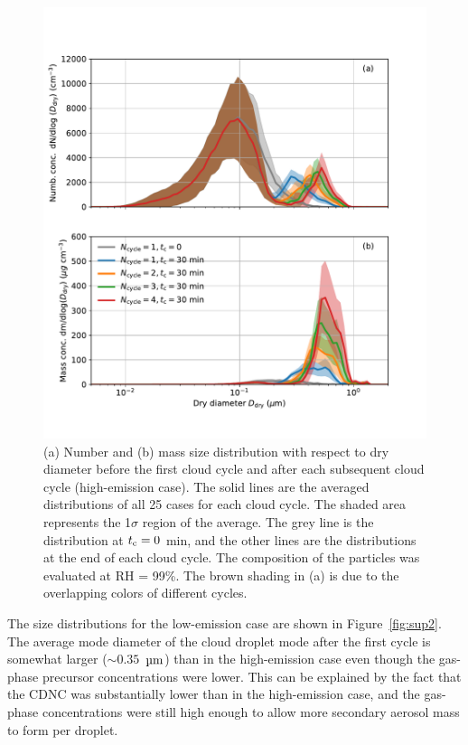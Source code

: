 \documentclass[edeposit,fullpage]{uiucthesis2009}
\begin{document}
\begin{figure}
    \centering
    \includegraphics[scale=0.45]{chap3_figs/fig5.pdf}
    \caption{(a) Number and (b) mass size distribution with respect to
      dry diameter before the first cloud cycle and after each
      subsequent cloud cycle (high-emission case). The solid
      lines are the averaged distributions of all 25 cases for each
      cloud cycle. The shaded area represents the 1$\sigma$ region of
      the average. The grey line is the distribution at $t_{\rm c}= 0$
      min, and the other lines are the distributions at the end of
      each cloud cycle. The composition of the particles was evaluated
      at RH = 99\%. The brown shading in (a) is due to the
        overlapping colors of different cycles.}
    \label{fig:size_number}
\end{figure}

The size distributions for the low-emission case are shown in
Figure~\ref{fig:sup2}. The average mode diameter of the cloud droplet
mode after the first cycle is somewhat larger ($\sim0.35$~$\rm \mu m$)
than in the high-emission case even though the gas-phase precursor
concentrations were lower. This can be explained by the fact that the
CDNC was substantially lower than in the high-emission case, and the
gas-phase concentrations were still high enough to allow more
secondary aerosol mass to form per droplet.
  
\end{document}
